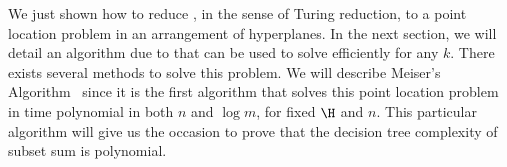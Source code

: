 We just shown how to reduce \kSUM, in the sense of Turing reduction, to a
point location problem in an arrangement of hyperplanes. In the next section,
we will detail an algorithm due to \citet*{meiser:1993} that can be used to
solve \kSUM efficiently for any $k$.  There exists several methods to solve
this problem. We will describe Meiser's Algorithm~\cite{meiser:1993} since it
is the first algorithm that solves this point location problem in time
polynomial in both $n$ and $\log m$, for fixed $\H$ and $n$. This particular
algorithm will give us the occasion to prove that the decision tree complexity
of subset sum is polynomial.

